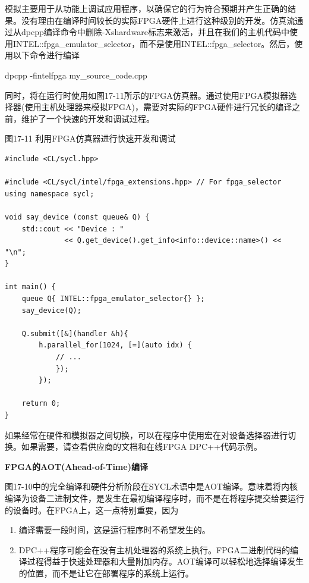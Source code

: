模拟主要用于从功能上调试应用程序，以确保它的行为符合预期并产生正确的结果。没有理由在编译时间较长的实际FPGA硬件上进行这种级别的开发。仿真流通过从dpcpp编译命令中删除-Xshardware标志来激活，并且在我们的主机代码中使用INTEL::fpga\_emulator\_selector，而不是使用INTEL::fpga\_selector。然后，使用以下命令进行编译\par

\begin{tcolorbox}[colback=white,colframe=black]
dpcpp -fintelfpga my\_source\_code.cpp
\end{tcolorbox}

同时，将在运行时使用如图17-11所示的FPGA仿真器。通过使用FPGA模拟器选择器(使用主机处理器来模拟FPGA)，需要对实际的FPGA硬件进行冗长的编译之前，维护了一个快速的开发和调试过程。\par

\hspace*{\fill} \par %
图17-11 利用FPGA仿真器进行快速开发和调试
\begin{lstlisting}[caption={}]
#include <CL/sycl.hpp>

#include <CL/sycl/intel/fpga_extensions.hpp> // For fpga_selector
using namespace sycl;

void say_device (const queue& Q) {
	std::cout << "Device : "
			  << Q.get_device().get_info<info::device::name>() << "\n";
}

int main() {
	queue Q{ INTEL::fpga_emulator_selector{} };
	say_device(Q);
	
	Q.submit([&](handler &h){
		h.parallel_for(1024, [=](auto idx) {
			// ...
			});
		});

	return 0;
}
\end{lstlisting}

如果经常在硬件和模拟器之间切换，可以在程序中使用宏在对设备选择器进行切换。如果需要，请查看供应商的文档和在线FPGA DPC++代码示例。\par

\hspace*{\fill} \par %
\textbf{FPGA的AOT(Ahead-of-Time)编译}

图17-10中的完全编译和硬件分析阶段在SYCL术语中是AOT编译。意味着将内核编译为设备二进制文件，是发生在最初编译程序时，而不是在将程序提交给要运行的设备时。在FPGA上，这一点特别重要，因为\par

\begin{enumerate}
	\item 编译需要一段时间，这是运行程序时不希望发生的。
	\item DPC++程序可能会在没有主机处理器的系统上执行。FPGA二进制代码的编译过程得益于快速处理器和大量附加内存。AOT编译可以轻松地选择编译发生的位置，而不是让它在部署程序的系统上运行。
\end{enumerate}

